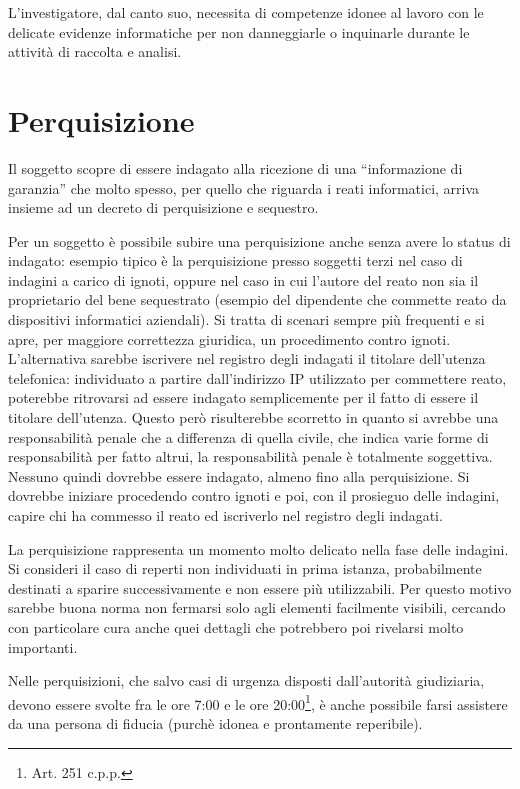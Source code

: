 L'investigatore, dal canto suo, necessita di competenze idonee al lavoro con le delicate evidenze informatiche per non danneggiarle o inquinarle durante le attività di raccolta e analisi. 

\section{Perquisizione}

Il soggetto scopre di essere indagato alla ricezione di una ``informazione di garanzia'' che molto spesso, per quello che riguarda i reati informatici, arriva insieme ad un decreto di perquisizione e sequestro.

Per un soggetto è possibile subire una perquisizione anche senza avere lo status di indagato: esempio tipico è la perquisizione presso soggetti terzi nel caso di indagini a carico di ignoti, oppure nel caso in cui l'autore del reato non sia il proprietario del bene sequestrato (esempio del dipendente che commette reato da dispositivi informatici aziendali). Si tratta di scenari sempre più frequenti e si apre, per maggiore correttezza giuridica, un procedimento contro ignoti. L'alternativa sarebbe iscrivere nel registro degli indagati il titolare dell'utenza telefonica: individuato a partire dall'indirizzo IP utilizzato per commettere reato, poterebbe ritrovarsi ad essere indagato semplicemente per il fatto di essere il titolare dell'utenza. Questo però risulterebbe scorretto in quanto si avrebbe una responsabilità penale che a differenza di quella civile, che indica varie forme di responsabilità per fatto altrui, la responsabilità penale è totalmente soggettiva. Nessuno quindi dovrebbe essere indagato, almeno fino alla perquisizione. Si dovrebbe iniziare procedendo contro ignoti e poi, con il prosieguo delle indagini, capire chi ha commesso il reato ed iscriverlo nel registro degli indagati.  

La perquisizione rappresenta un momento molto delicato nella fase delle indagini. Si consideri il caso di reperti non individuati in prima istanza, probabilmente destinati a sparire successivamente e non essere più utilizzabili. Per questo motivo sarebbe buona norma non fermarsi solo agli elementi facilmente visibili, cercando con particolare cura anche quei dettagli che potrebbero poi rivelarsi molto importanti.

Nelle perquisizioni, che salvo casi di urgenza disposti dall'autorità giudiziaria, devono essere svolte fra le ore 7:00 e le ore 20:00\footnote{Art. 251 c.p.p.}, è anche possibile farsi assistere da una persona di fiducia (purchè idonea e prontamente reperibile).

